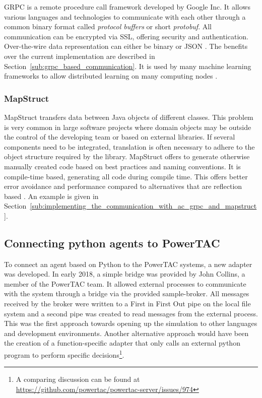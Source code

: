 \acf {GRPC} is a remote procedure call framework developed by Google Inc. It allows various languages and technologies to
communicate with each other through a common binary format called \emph{protocol buffers} or short \emph{protobuf}. All
communication can be encrypted via \ac{SSL}, offering
security and authentication. Over-the-wire data representation can either be binary or \ac{JSON}
\citep[]{grpc}. The benefits over the
current implementation are described in Section~\ref{sub:grpc_based_communication}. It is used by many machine learning
frameworks to allow distributed learning on many computing nodes \cite[]{tensorflow2015-whitepaper}.


\subsubsection{MapStruct}%
\label{sub:mapstruct}

MapStruct transfers data between Java objects of different classes. This problem is very common in large
software projects where domain objects may be outside the control of the developing team or based on external libraries.
If several components need to be integrated, translation is often necessary to adhere to the object structure required
by the library. MapStruct offers to generate otherwise manually created code based on best practices and naming
conventions. It is compile-time based, generating all code during compile time. This offers better error avoidance and
performance compared to alternatives that are reflection based
\citep[]{mapstruct}.
An example is given in Section~\ref{sub:implementing_the_communication_with_ac_grpc_and_mapstruct}.





\subsection{Connecting python agents to PowerTAC}%
\label{sec:connecting_python_agents_to_powertac}



To connect an agent based on Python to the \ac{PowerTAC} systems, a new adapter was developed. In early 2018, a simple bridge
was provided by John Collins, a member of the \ac{PowerTAC} team. It allowed external processes to communicate with the
system through a bridge via the provided sample-broker. All messages received by the broker were written to a First in
First Out pipe on the local file system and a second pipe was created to read messages from the external process. This
was the first approach towards opening up the simulation to other languages and development environments. Another
alternative approach would have been the creation of a function-specific adapter that only calls an external python
program to perform specific decisions\footnote{A comparing discussion can be found at
\url{https://github.com/powertac/powertac-server/issues/974}}.

